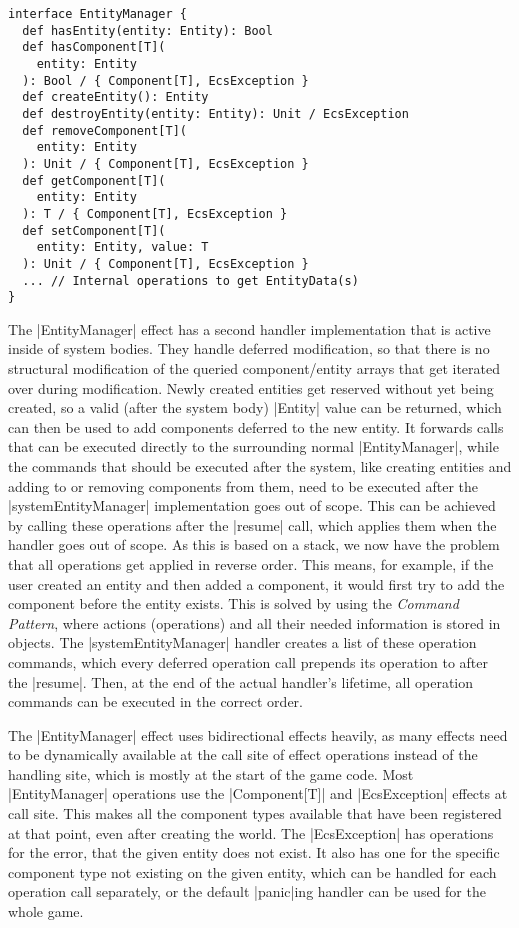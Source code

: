 \begin{lstlisting}[caption=EntityManager signature]
interface EntityManager {
  def hasEntity(entity: Entity): Bool
  def hasComponent[T](
    entity: Entity
  ): Bool / { Component[T], EcsException }
  def createEntity(): Entity
  def destroyEntity(entity: Entity): Unit / EcsException
  def removeComponent[T](
    entity: Entity
  ): Unit / { Component[T], EcsException }
  def getComponent[T](
    entity: Entity
  ): T / { Component[T], EcsException }
  def setComponent[T](
    entity: Entity, value: T
  ): Unit / { Component[T], EcsException }
  ... // Internal operations to get EntityData(s)
}
\end{lstlisting}

The |EntityManager| effect has a second handler implementation that is active inside of system bodies. They handle deferred modification, so that there is no structural modification of the queried component/entity arrays that get iterated over during modification. Newly created entities get reserved without yet being created, so a valid (after the system body) |Entity| value can be returned, which can then be used to add components deferred to the new entity. It forwards calls that can be executed directly to the surrounding normal |EntityManager|, while the commands that should be executed after the system, like creating entities and adding to or removing components from them, need to be executed after the |systemEntityManager| implementation goes out of scope. This can be achieved by calling these operations after the |resume| call, which applies them when the handler goes out of scope. As this is based on a stack, we now have the problem that all operations get applied in reverse order. This means, for example, if the user created an entity and then added a component, it would first try to add the component before the entity exists. This is solved by using the \textit{Command Pattern}, where actions (operations) and all their needed information is stored in objects. The |systemEntityManager| handler creates a list of these operation commands, which every deferred operation call prepends its operation to after the |resume|. Then, at the end of the actual handler's lifetime, all operation commands can be executed in the correct order.

The |EntityManager| effect uses bidirectional effects heavily, as many effects need to be dynamically available at the call site of effect operations instead of the handling site, which is mostly at the start of the game code. Most |EntityManager| operations use the |Component[T]| and |EcsException| effects at call site. This makes all the component types available that have been registered at that point, even after creating the world. The |EcsException| has operations for the error, that the given entity does not exist. It also has one for the specific component type not existing on the given entity, which can be handled for each operation call separately, or the default |panic|ing handler can be used for the whole game.

